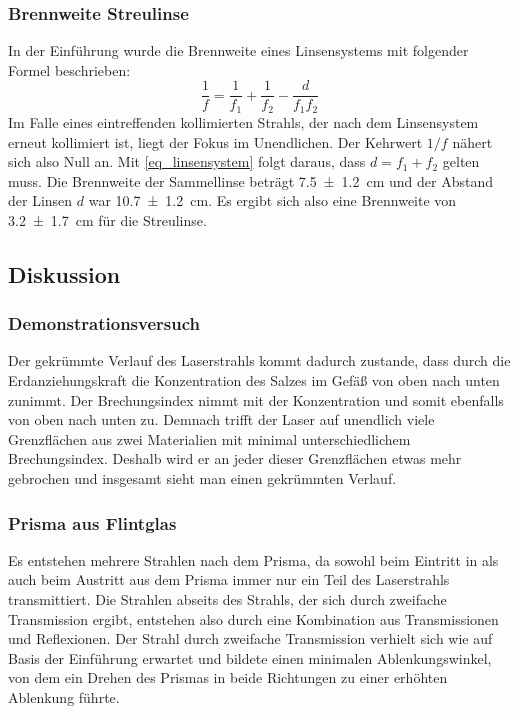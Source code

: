 \documentclass[
	a4paper,
	12pt,
	pagesize,
	ngerman
]{scrartcl}
\begin{document}
	\subsubsection{Brennweite Streulinse}
	In der Einführung wurde die Brennweite eines Linsensystems mit folgender Formel beschrieben:
	\begin{equation}
		\frac{1}{f} = \frac{1}{f_1} + \frac{1}{f_2} - \frac{d}{f_1 f_2}
		\label{eq_linsensystem}
	\end{equation}
	Im Falle eines eintreffenden kollimierten Strahls, der nach dem Linsensystem erneut kollimiert ist, liegt der Fokus im Unendlichen.
	Der Kehrwert $1/f$ nähert sich also Null an.
	Mit \cref{eq_linsensystem} folgt daraus, dass $d = f_1 + f_2$ gelten muss.
	Die Brennweite der Sammellinse beträgt \SI{7,5+-1,2}{cm} und der Abstand der Linsen $d$ war \SI{10,7 +- 1,2}{cm}.
	Es ergibt sich also eine Brennweite von \SI{3,2+-1,7}{cm} für die Streulinse.
	\subsection{Diskussion}
	\subsubsection{Demonstrationsversuch}
	Der gekrümmte Verlauf des Laserstrahls kommt dadurch zustande, dass durch die Erdanziehungskraft die Konzentration des Salzes im Gefäß von oben nach unten zunimmt.
	Der Brechungsindex nimmt mit der Konzentration und somit ebenfalls von oben nach unten zu. %
	Demnach trifft der Laser auf unendlich viele Grenzflächen aus zwei Materialien mit minimal unterschiedlichem Brechungsindex.
	Deshalb wird er an jeder dieser Grenzflächen etwas mehr gebrochen und insgesamt sieht man einen gekrümmten Verlauf.
	\subsubsection{Prisma aus Flintglas}
	Es entstehen mehrere Strahlen nach dem Prisma, da sowohl beim Eintritt in als auch beim Austritt aus dem Prisma immer nur ein Teil des Laserstrahls transmittiert.
	Die Strahlen abseits des Strahls, der sich durch zweifache Transmission ergibt, entstehen also durch eine Kombination aus Transmissionen und Reflexionen.
	Der Strahl durch zweifache Transmission verhielt sich wie auf Basis der Einführung erwartet und bildete einen minimalen Ablenkungswinkel, von dem ein Drehen des Prismas in beide Richtungen zu einer erhöhten Ablenkung führte. %
	
\end{document}
